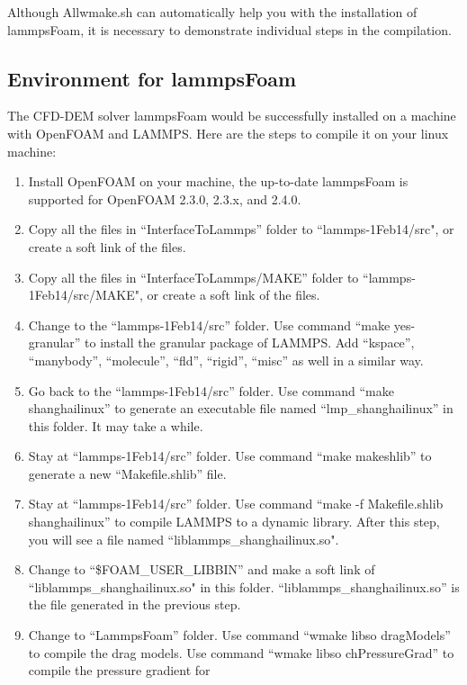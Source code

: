 \documentclass[11pt]{article}
\begin{document}
Although Allwmake.sh can automatically help you with the installation of lammpsFoam, it is necessary
to demonstrate individual steps in the compilation.

\subsection{Environment for lammpsFoam}
The CFD-DEM solver lammpsFoam would be successfully installed on a machine with OpenFOAM and LAMMPS.
Here are the steps to compile it on your linux machine:
\begin{enumerate}
    \item Install OpenFOAM on your machine, the up-to-date lammpsFoam is supported for OpenFOAM
        2.3.0, 2.3.x, and 2.4.0.
    \item Copy all the files in ``InterfaceToLammps'' folder to ``lammps-1Feb14/src", or create a
        soft link of the files.
    \item Copy all the files in ``InterfaceToLammps/MAKE'' folder to ``lammps-1Feb14/src/MAKE", or
      create a soft link of the files.
    \item Change to the ``lammps-1Feb14/src'' folder. Use command ``make yes-granular'' to install
        the granular package of LAMMPS. Add ``kspace'', ``manybody'', ``molecule'', ``fld'',
        ``rigid'', ``misc'' as well
        in a similar way.
    \item Go back to the ``lammps-1Feb14/src'' folder. Use command ``make shanghailinux'' to
        generate an executable file named ``lmp\_shanghailinux'' in this folder. It may take a
        while.
    \item Stay at ``lammps-1Feb14/src'' folder. Use command ``make makeshlib'' to generate a new
        ``Makefile.shlib'' file.
    \item Stay at ``lammps-1Feb14/src'' folder. Use command ``make -f Makefile.shlib shanghailinux''
        to compile LAMMPS to a dynamic library. After this step, you will see a file named
        ``liblammps\_shanghailinux.so".
    \item Change to ``\$FOAM\_USER\_LIBBIN'' and make a soft link of ``liblammps\_shanghailinux.so"
        in this folder. ``liblammps\_shanghailinux.so'' is the file generated in the previous step.
    \item Change to ``LammpsFoam'' folder. Use command ``wmake libso dragModels'' to compile the
        drag models. Use command ``wmake libso chPressureGrad'' to compile the pressure gradient for

\end{enumerate}
\end{document}
